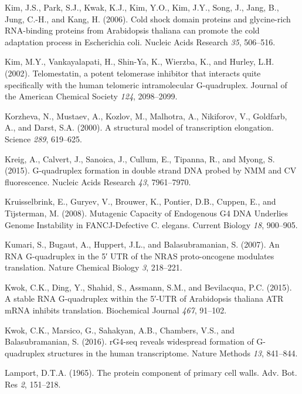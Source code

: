 \documentclass[12pt,a4paper,]{report}
\begin{document}
\leavevmode\hypertarget{ref-Kim2006}{}%
Kim, J.S., Park, S.J., Kwak, K.J., Kim, Y.O., Kim, J.Y., Song, J., Jang,
B., Jung, C.-H., and Kang, H. (2006). Cold shock domain proteins and
glycine-rich RNA-binding proteins from Arabidopsis thaliana can promote
the cold adaptation process in Escherichia coli. Nucleic Acids Research
\emph{35}, 506--516.

\leavevmode\hypertarget{ref-Kim2002}{}%
Kim, M.Y., Vankayalapati, H., Shin-Ya, K., Wierzba, K., and Hurley, L.H.
(2002). Telomestatin, a potent telomerase inhibitor that interacts quite
specifically with the human telomeric intramolecular G-quadruplex.
Journal of the American Chemical Society \emph{124}, 2098--2099.

\leavevmode\hypertarget{ref-Korzheva2000}{}%
Korzheva, N., Mustaev, A., Kozlov, M., Malhotra, A., Nikiforov, V.,
Goldfarb, A., and Darst, S.A. (2000). A structural model of
transcription elongation. Science \emph{289}, 619--625.

\leavevmode\hypertarget{ref-Kreig2015}{}%
Kreig, A., Calvert, J., Sanoica, J., Cullum, E., Tipanna, R., and Myong,
S. (2015). G-quadruplex formation in double strand DNA probed by NMM and
CV fluorescence. Nucleic Acids Research \emph{43}, 7961--7970.

\leavevmode\hypertarget{ref-Kruisselbrink2008}{}%
Kruisselbrink, E., Guryev, V., Brouwer, K., Pontier, D.B., Cuppen, E.,
and Tijsterman, M. (2008). Mutagenic Capacity of Endogenous G4 DNA
Underlies Genome Instability in FANCJ-Defective C. elegans. Current
Biology \emph{18}, 900--905.

\leavevmode\hypertarget{ref-Kumari2007}{}%
Kumari, S., Bugaut, A., Huppert, J.L., and Balasubramanian, S. (2007).
An RNA G-quadruplex in the 5′ UTR of the NRAS proto-oncogene modulates
translation. Nature Chemical Biology \emph{3}, 218--221.

\leavevmode\hypertarget{ref-Kwok2015}{}%
Kwok, C.K., Ding, Y., Shahid, S., Assmann, S.M., and Bevilacqua, P.C.
(2015). A stable RNA G-quadruplex within the 5′-UTR of Arabidopsis
thaliana ATR mRNA inhibits translation. Biochemical Journal \emph{467},
91--102.

\leavevmode\hypertarget{ref-Kwok2016}{}%
Kwok, C.K., Marsico, G., Sahakyan, A.B., Chambers, V.S., and
Balasubramanian, S. (2016). rG4-seq reveals widespread formation of
G-quadruplex structures in the human transcriptome. Nature Methods
\emph{13}, 841--844.

\leavevmode\hypertarget{ref-Lamport1965}{}%
Lamport, D.T.A. (1965). The protein component of primary cell walls.
Adv. Bot. Res \emph{2}, 151--218.
\end{document}
